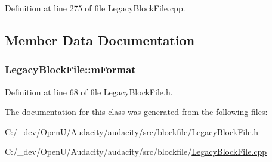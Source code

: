 Definition at line 275 of file Legacy\+Block\+File.\+cpp.



\subsection{Member Data Documentation}
\subsubsection[{\texorpdfstring{m\+Format}{mFormat}}]{ Legacy\+Block\+File\+::m\+Format\hspace{0.3cm}{\ttfamily [protected]}}\hypertarget{class_legacy_block_file_a3ea39b3d6eacf502029526539d9b4ba7}{}\label{class_legacy_block_file_a3ea39b3d6eacf502029526539d9b4ba7}


Definition at line 68 of file Legacy\+Block\+File.\+h.



The documentation for this class was generated from the following files\+:\begin{DoxyCompactItemize}
\item 
C\+:/\+\_\+dev/\+Open\+U/\+Audacity/audacity/src/blockfile/\hyperlink{_legacy_block_file_8h}{Legacy\+Block\+File.\+h}\item 
C\+:/\+\_\+dev/\+Open\+U/\+Audacity/audacity/src/blockfile/\hyperlink{_legacy_block_file_8cpp}{Legacy\+Block\+File.\+cpp}\end{DoxyCompactItemize}
